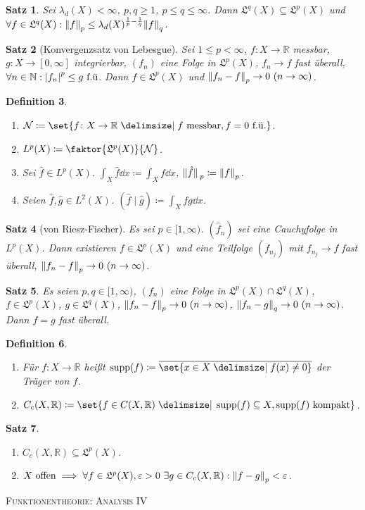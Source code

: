 \documentclass[a4paper]{article}
\newcounter{Sec}
\theoremstyle{marginbreak}
\newtheorem{definition}{Definition}[Sec]
\newtheorem{satz}[definition]{Satz}
\newcommand{\en}{~(n\to\infty)}
\newcommand{\R}{\mathbb{R}}
\renewcommand{\L}[1]{\mathfrak{L}^{#1}(X)}
\newcommand{\LL}[1]{L^{#1}(X)}
\DeclareMathOperator{\supp}{supp}
\begin{document}
	\begin{satz}
		Sei $\lambda_d(X)<\infty$, $p, q\geq 1$, $p\leq q\leq\infty$. Dann $\L{q}\subseteq\L{p}$ und
		$\forall f\in\L{q}:\norm{f}_p\leq\lambda_d(X)^{\frac{1}{p}-\frac{1}{q}}\norm{f}_q$.
	\end{satz}
	\begin{satz}[Konvergenzsatz von Lebesgue]
		Sei $1\leq p<\infty$, $f\colon X\to\R$ messbar, $g\colon X\to[0,\infty]$ integrierbar,
		$(f_n)$ eine Folge in $\L{p}$, $f_n\to f$ fast überall, $\forall n\in\mathbb{N}: \abs{f_n}^p\leq g~\text{f.ü}$.
		Dann $f\in\L{p}$ und $\norm{f_n-f}_p\to 0\en$.
	\end{satz}
	\begin{definition}
		\begin{enumerate}[label=(\alph*)]
			\item $\mathcal{N}\coloneqq\set{f\colon X\to\R\given f~\text{messbar}, f=0~\text{f.ü.}}$.
			\item $\LL{p}\coloneqq\faktor{\L{p}}{\mathcal{N}}$.
			\item Sei $\hat{f}\in\LL{p}$. $\int_X\hat{f}\dd{x}\coloneqq\int_Xf\dd{x}$, $\norm*{\hat{f}}_p\coloneqq\norm{f}_p$.
			\item Seien $\hat{f}, \hat{g}\in\LL{2}$. $(\hat{f}\mid\hat{g})\coloneqq\int_Xfg\dd{x}$.
		\end{enumerate}
	\end{definition}
	\begin{satz}[von Riesz-Fischer]
		Es sei $p\in[1,\infty)$. $(\hat{f}_n)$ sei eine Cauchyfolge in $\LL{p}$. Dann existieren $f\in\L{p}$ und
		eine Teilfolge $(f_{n_j})$ mit $f_{n_j}\to f$ fast überall, $\norm{f_n-f}_p\to0\en$.
	\end{satz}
	\begin{satz}
		Es seien $p, q\in[1,\infty)$, $(f_n)$ eine Folge in $\L{p}\cap\L{q}$, $f\in\L{p}$, $g\in\L{q}$,
		$\norm{f_n-f}_p\to 0\en$, $\norm{f_n-g}_q\to 0\en$. Dann $f=g$ fast überall.
	\end{satz}
	\begin{definition}
		\begin{enumerate}[label=(\alph*)]
			\item Für $f\colon X\to\R$ heißt $\supp(f)\coloneqq\overline{\set{x\in X\given f(x)\neq0}}$ der Träger von $f$.
			\item $C_c(X,\R)\coloneqq\set{f\in C(X,\R)\given \supp(f)\subseteq X, \supp(f)~\text{kompakt}}$.
		\end{enumerate}
	\end{definition}
	\begin{satz}
		\begin{enumerate}[label=(\alph*)]
			\item $C_c(X,\R)\subseteq\L{p}$.
			\item $X~\text{offen}\implies\forall f\in\L{p},\varepsilon>0~\exists g\in C_c(X,\R):\norm{f-g}_p<\varepsilon$.
		\end{enumerate}
	\end{satz}
	\newpage
	\textsc{Funktionentheorie: Analysis IV}
\end{document}
